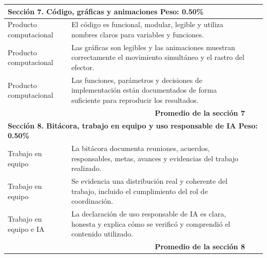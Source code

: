 \documentclass[12pt]{article}
\begin{document}
{\begin{longtable}{|p{3.7cm}|p{7.0cm}|>{\centering\arraybackslash}p{1cm}|p{3.0cm}|}
\multicolumn{4}{|l|}{\textbf{Sección 7. Código, gráficas y animaciones \hfill Peso: 0.50\%}}\\
\hline
Producto computacional &
El código es funcional, modular, legible y utiliza nombres claros para variables y funciones. & & \\
\hline
Producto computacional &
Las gráficas son legibles y las animaciones muestran correctamente el movimiento simultáneo y el rastro del efector. & & \\
\hline
Producto computacional &
Las funciones, parámetros y decisiones de implementación están documentados de forma suficiente para reproducir los resultados. & & \\
\hline
\multicolumn{2}{|r|}{\textbf{Promedio de la sección 7}} & & \\
\hline

\multicolumn{4}{|l|}{\textbf{Sección 8. Bitácora, trabajo en equipo y uso responsable de IA \hfill Peso: 0.50\%}}\\
\hline
Trabajo en equipo &
La bitácora documenta reuniones, acuerdos, responsables, metas, avances y evidencias del trabajo realizado. & & \\
\hline
Trabajo en equipo &
Se evidencia una distribución real y coherente del trabajo, incluido el cumplimiento del rol de coordinación. & & \\
\hline
Trabajo en equipo e IA &
La declaración de uso responsable de IA es clara, honesta y explica cómo se verificó y comprendió el contenido utilizado. & & \\
\hline
\multicolumn{2}{|r|}{\textbf{Promedio de la sección 8}} & & \\
\hline

\end{longtable}
}
\end{document}
